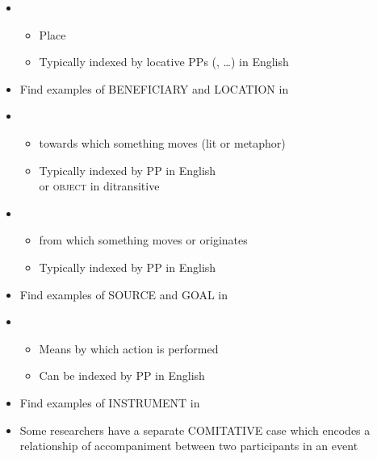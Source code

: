 \documentclass[a4paper,landscape,headrule,footrule,xetex]{foils}
\begin{document}
\begin{itemize}
\item  {}
  \begin{itemize}
  \item  Place
  \item Typically indexed by locative PPs (, \ldots) in English
  \end{itemize}
  \begin{exe}
  \ex{}
  \ex{}
\end{exe}
\item Find  examples of BENEFICIARY and LOCATION in \Story{}\task
\newpage  

\item  {}
  \begin{itemize}
  \item  towards which something moves (lit or metaphor)
 \item  Typically indexed by  PP in English 
   \\ or \textsc{object} in ditransitive
  \end{itemize}
  \begin{exe}
  \ex{}
  \ex{}
  \end{exe}
\item  {}
 \begin{itemize}
 \item  from which something moves or originates
 \item  Typically indexed by  PP in English
 \end{itemize}
  \begin{exe}
 \ex{}  
\end{exe}
\item Find  examples of SOURCE and GOAL in \Story{}\task
\newpage
\item  {}
  \begin{itemize}
  \item  Means by which action is performed
  \item  Can be indexed by  PP in English
  \end{itemize}
  \begin{exe}
    \ex{}
  \end{exe}
\item Find examples of INSTRUMENT in \Story{}\task
\item Some researchers have a separate COMITATIVE case which encodes a
  relationship of accompaniment between two participants in an event 
\end{itemize}
\end{document}
